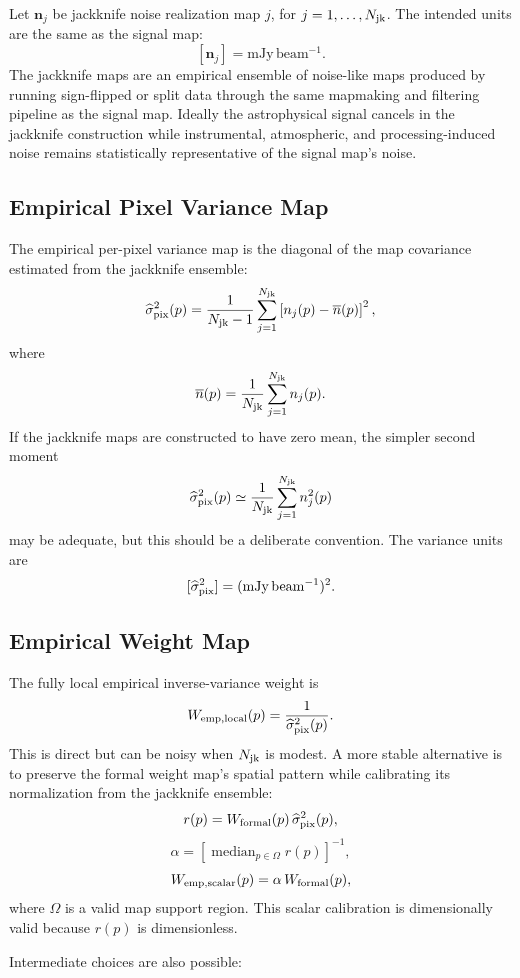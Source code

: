 \documentclass[11pt]{article}
\newcommand{\noise}{\boldsymbol{n}}
\newcommand{\median}{\operatorname{median}}
\begin{document}
Let \(\noise_j\) be jackknife noise realization map \(j\), for
\(j=1,\ldots,N_{\rm jk}\). The intended units are the same as the signal map:
\[
  [\noise_j] = \mathrm{mJy\,beam^{-1}}.
\]
The jackknife maps are an empirical ensemble of noise-like maps produced by
running sign-flipped or split data through the same mapmaking and filtering
pipeline as the signal map. Ideally the astrophysical signal cancels in the
jackknife construction while instrumental, atmospheric, and processing-induced
noise remains statistically representative of the signal map's noise.

\subsection{Empirical Pixel Variance Map}

The empirical per-pixel variance map is the diagonal of the map covariance
estimated from the jackknife ensemble:
\[
  \widehat{\sigma}^2_{\rm pix}(p)
    =
    \frac{1}{N_{\rm jk} - 1}
    \sum_{j=1}^{N_{\rm jk}}
    \left[
      n_j(p) - \overline{n}(p)
    \right]^2,
\]
where
\[
  \overline{n}(p) =
    \frac{1}{N_{\rm jk}}
    \sum_{j=1}^{N_{\rm jk}} n_j(p).
\]
If the jackknife maps are constructed to have zero mean, the simpler second
moment
\[
  \widehat{\sigma}^2_{\rm pix}(p)
    \simeq
    \frac{1}{N_{\rm jk}}
    \sum_{j=1}^{N_{\rm jk}} n_j^2(p)
\]
may be adequate, but this should be a deliberate convention. The variance units
are
\[
  [\widehat{\sigma}^2_{\rm pix}] = (\mathrm{mJy\,beam^{-1}})^2.
\]

\subsection{Empirical Weight Map}

The fully local empirical inverse-variance weight is
\[
  W_{\rm emp,local}(p) =
    \frac{1}{\widehat{\sigma}^2_{\rm pix}(p)}.
\]
This is direct but can be noisy when \(N_{\rm jk}\) is modest. A more stable
alternative is to preserve the formal weight map's spatial pattern while
calibrating its normalization from the jackknife ensemble:
\[
  r(p) =
    W_{\rm formal}(p)\,\widehat{\sigma}^2_{\rm pix}(p),
\]
\[
  \alpha =
    \left[
      \median_{p\in \Omega} r(p)
    \right]^{-1},
\]
\[
  W_{\rm emp,scalar}(p) =
    \alpha\,W_{\rm formal}(p),
\]
where \(\Omega\) is a valid map support region. This scalar calibration is
dimensionally valid because \(r(p)\) is dimensionless.

Intermediate choices are also possible:
\end{document}
